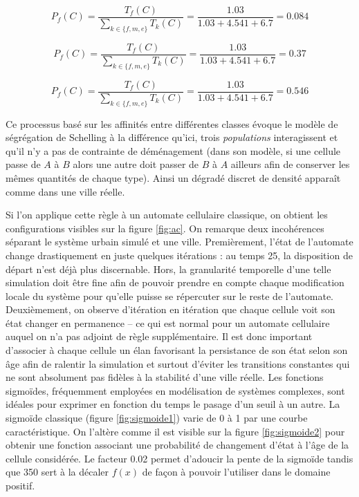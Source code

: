 \documentclass[12pt]{article}
\begin{document}
\begin{equation*}
P_f(C) = \frac{T_f(C)}{\sum_{k \in \{f,m,e\}} T_k(C)} = \frac{1.03}{1.03 + 4.541 + 6.7} = 0.084
\end{equation*}

\begin{equation*}
P_f(C) = \frac{T_f(C)}{\sum_{k \in \{f,m,e\}} T_k(C)} = \frac{1.03}{1.03 + 4.541 + 6.7} = 0.37
\end{equation*}

\begin{equation*}
P_f(C) = \frac{T_f(C)}{\sum_{k \in \{f,m,e\}} T_k(C)} = \frac{1.03}{1.03 + 4.541 + 6.7} = 0.546
\end{equation*}

Ce processus basé sur les affinités entre différentes classes évoque
le modèle de ségrégation de Schelling à la différence qu'ici, trois
\textit{populations} interagissent et qu'il n'y a pas de contrainte de
déménagement (dans son modèle, si une cellule passe de $A$ à $B$ alors
une autre doit passer de $B$ à $A$ ailleurs afin de conserver les
mêmes quantités de chaque type). Ainsi un dégradé discret de densité
apparaît comme dans une ville réelle.

Si l'on applique cette règle à un automate cellulaire classique, on
obtient les configurations visibles sur la figure \ref{fig:ac}. On
remarque deux incohérences séparant le système urbain simulé et une
ville. Premièrement, l'état de l'automate change drastiquement en
juste quelques itérations : au temps 25, la disposition de départ
n'est déjà plus discernable. Hors, la granularité temporelle d'une
telle simulation doit être fine afin de pouvoir prendre en compte
chaque modification locale du système pour qu'elle puisse se
répercuter sur le reste de l'automate. Deuxièmement, on observe
d'itération en itération que chaque cellule voit son état changer en
permanence -- ce qui est normal pour un automate cellulaire auquel on
n'a pas adjoint de règle supplémentaire. Il est donc important
d'associer à chaque cellule un élan favorisant la persistance de son
état selon son âge afin de ralentir la simulation et surtout d'éviter
les transitions constantes qui ne sont absolument pas fidèles à la
stabilité d'une ville réelle. Les fonctions sigmoïdes, fréquemment
employées en modélisation de systèmes complexes, sont idéales pour
exprimer en fonction du temps le pasage d'un seuil à un autre. La
sigmoïde classique (figure \ref{fig:sigmoide1}) varie de 0 à 1 par une
courbe caractéristique. On l'altère comme il est visible sur la figure
\ref{fig:sigmoide2} pour obtenir une fonction associant une
probabilité de changement d'état à l'âge de la cellule considérée. Le
facteur 0.02 permet d'adoucir la pente de la sigmoïde tandis que 350
sert à la décaler $f(x)$ de façon à pouvoir l'utiliser dans le domaine
positif.
\end{document}
